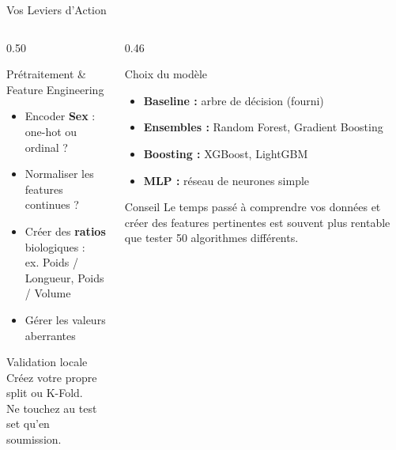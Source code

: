 \documentclass[aspectratio=169, 10pt]{beamer}
\begin{document}
\begin{frame}{Vos Leviers d'Action}
  \begin{columns}[T]
    \begin{column}{0.50\textwidth}
      \begin{block}{Prétraitement \& Feature Engineering}
        \begin{itemize}
          \item Encoder \textbf{Sex} : one-hot ou ordinal ?
          \item Normaliser les features continues ?
          \item Créer des \textbf{ratios} biologiques :\\
                ex. Poids / Longueur, Poids / Volume
          \item Gérer les valeurs aberrantes
        \end{itemize}
      \end{block}
      \smallskip
      \begin{block}{Validation locale}
        Créez votre propre split ou K-Fold.\\
        Ne touchez au test set qu'en soumission.
      \end{block}
    \end{column}
    \begin{column}{0.46\textwidth}
      \begin{block}{Choix du modèle}
        \begin{itemize}
          \item \textbf{Baseline :} arbre de décision (fourni)
          \item \textbf{Ensembles :} Random Forest,
                Gradient Boosting
          \item \textbf{Boosting :} XGBoost, LightGBM
          \item \textbf{MLP :} réseau de neurones simple
        \end{itemize}
      \end{block}
      \smallskip
      \begin{exampleblock}{Conseil}
        Le temps passé à comprendre vos données et créer
        des features pertinentes est souvent plus rentable
        que tester 50 algorithmes différents.
      \end{exampleblock}
    \end{column}
  \end{columns}
\end{frame}

\end{document}
